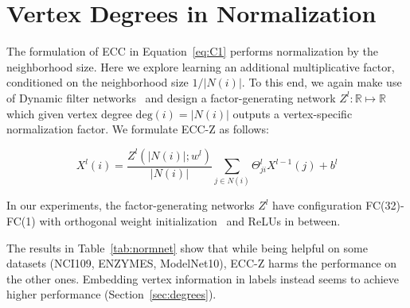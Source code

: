 \documentclass[10pt,twocolumn,letterpaper]{article}
\begin{document}
\section{Vertex Degrees in Normalization} \label{sec:normnet}

The formulation of ECC in Equation~\ref{eq:C1} performs normalization by the neighborhood size. Here we explore learning an additional multiplicative factor, conditioned on the neighborhood size $1/|N(i)|$. To this end, we again make use of Dynamic filter networks~\cite{dfn16} and design a factor-generating network $Z^l: \mathbb{R} \mapsto \mathbb{R}$  which given vertex degree $\mathrm{deg}(i) = |N(i)|$  outputs a vertex-specific normalization factor. We formulate ECC-Z as follows:

\begin{equation}
X^l(i) = \frac{Z^l(|N(i)|;w^l)}{|N(i)|} \sum_{j\in N(i)} \Theta_{ji}^l X^{l-1}(j) + b^l \label{eq:CZ}
\end{equation}

In our experiments, the factor-generating networks $Z^l$ have configuration FC(32)-FC(1) with orthogonal weight initialization~\cite{orthoinit} and ReLUs in between. 

The results in Table~\ref{tab:normnet} show that while being helpful on some datasets (NCI109, ENZYMES, ModelNet10), ECC-Z harms the performance on the other ones. Embedding vertex information in labels instead seems to achieve higher performance (Section~\ref{sec:degrees}).


\begin{table}[bt]
\centering
{}
\vspace{1ex}
\caption{\label{tab:normnet}
The effect of adding a learned normalization factor (improvements in italics). Performance metrics vary and are specific to each dataset, as introduced in the main paper.}
\end{table}
\end{document}
